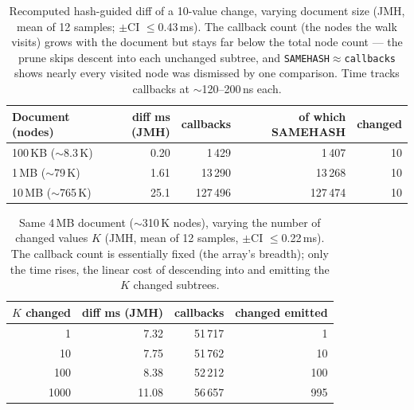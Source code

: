 \documentclass[11pt,a4paper,oneside]{report}
\theoremstyle{sirixthm}
\newcommand{\code}[1]{\texttt{#1}}
\begin{document}
\begin{table}[h]
\centering\footnotesize\setlength{\tabcolsep}{7pt}\renewcommand{\arraystretch}{1.25}
\begin{tabular}{@{}l r r r r@{}}
\toprule
\textbf{Document (nodes)} & \textbf{diff ms (JMH)} & \textbf{callbacks} & \textbf{of which SAMEHASH} & \textbf{changed}\\
\midrule
100\,KB ($\sim$8.3\,K)  & 0.20 & 1\,429   & 1\,407   & 10\\
1\,MB ($\sim$79\,K)     & 1.61 & 13\,290  & 13\,268  & 10\\
10\,MB ($\sim$765\,K)   & 25.1 & 127\,496 & 127\,474 & 10\\
\bottomrule
\end{tabular}
\caption{Recomputed hash-guided diff of a 10-value change, varying document size (JMH, mean of 12 samples;
$\pm$CI $\le$0.43\,ms). The callback count (the nodes the walk visits) grows with the document but stays
far below the total node count --- the prune skips descent into each unchanged subtree, and
\code{SAMEHASH}$\approx$\code{callbacks} shows nearly every visited node was dismissed by one comparison.
Time tracks callbacks at $\sim$120--200\,ns each.}
\label{tab:diffbench-size}
\end{table}

\begin{table}[h]
\centering\footnotesize\setlength{\tabcolsep}{7pt}\renewcommand{\arraystretch}{1.25}
\begin{tabular}{@{}r r r r@{}}
\toprule
\textbf{$K$ changed} & \textbf{diff ms (JMH)} & \textbf{callbacks} & \textbf{changed emitted}\\
\midrule
1    & 7.32  & 51\,717 & 1\\
10   & 7.75  & 51\,762 & 10\\
100  & 8.38  & 52\,212 & 100\\
1000 & 11.08 & 56\,657 & 995\\
\bottomrule
\end{tabular}
\caption{Same 4\,MB document ($\sim$310\,K nodes), varying the number of changed values $K$ (JMH, mean of
12 samples, $\pm$CI $\le$0.22\,ms). The callback count is essentially fixed (the array's breadth); only the
time rises, the linear cost of descending into and emitting the $K$ changed subtrees.}
\label{tab:diffbench-k}
\end{table}
\end{document}
